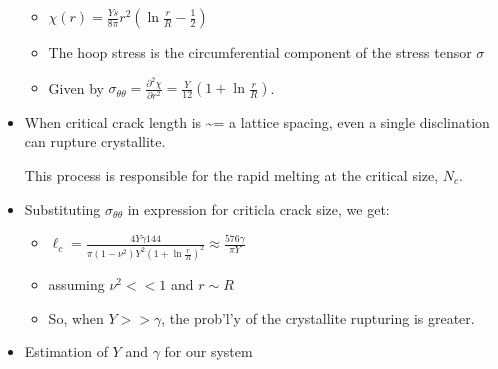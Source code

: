 \documentclass[11pt]{article}
\begin{document}
\begin{itemize}
\begin{itemize}
\item $\chi(r) =  \frac{Y s}{8 \pi} r^2   \left ( \ln \frac{r}{R} - \frac{1}{2} \right )$\\
\label{sec-3.1.5.4.3}


\item The hoop stress is the circumferential component of the stress tensor $\sigma$\\
\label{sec-3.1.5.4.4}


\item Given by $\sigma_{\theta \theta}= \frac{\partial^2 \chi}{\partial r^2}=  \frac{Y}{12} \left(1 + \ln \frac{r}{R} \right )$.\\
\label{sec-3.1.5.4.5}

\end{itemize} %

\item When critical crack length is \~{}= a lattice spacing, even a single disclination can rupture crystallite.\\
\label{sec-3.1.5.5}

This process is responsible for the rapid melting at the critical size, $N_c$.

\item Substituting  $\sigma_{\theta \theta}$ in expression for criticla crack size, we get:\\
\label{sec-3.1.5.6}

\begin{itemize}

\item $\ell_c = \frac{ 4 Y \gamma 144}{\pi (1-\nu^2) Y^2 (1+ \ln \frac{r}{R})^2} \approx \frac{576 \gamma}{\pi Y}$\\
\label{sec-3.1.5.6.1}


\item assuming $\nu^2 << 1$ and $r \sim R$\\
\label{sec-3.1.5.6.2}


\item So, when $Y >> \gamma$, the prob'l'y of the crystallite rupturing is greater.\\
\label{sec-3.1.5.6.3}

\end{itemize} %

\item Estimation of $Y$ and $\gamma$ for our system\\
\label{sec-3.1.5.7}

\begin{itemize}


\end{itemize}
\end{itemize}
\end{document}
